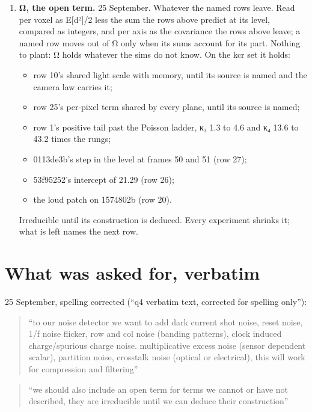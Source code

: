 \begin{enumerate}
\item \textbf{Ω, the open term.} 25 September. Whatever the named rows leave. Read per voxel as E[d²]/2 less the sum the rows above predict at its level, compared as integers, and per axis as the covariance the rows above leave; a named row moves out of Ω only when its sums account for its part. Nothing to plant: Ω holds whatever the sims do not know. On the kcr set it holds:

\begin{itemize}
\item row 10's shared light scale with memory, until its source is named and the camera law carries it;
\item row 25's per-pixel term shared by every plane, until its source is named;
\item row 1's positive tail past the Poisson ladder, κ₃ 1.3 to 4.6 and κ₄ 13.6 to 43.2 times the rungs;
\item 0113de3b's step in the level at frames 50 and 51 (row 27);
\item 53f95252's intercept of 21.29 (row 26);
\item the loud patch on 1574802b (row 20).
\end{itemize}

Irreducible until its construction is deduced. Every experiment shrinks it; what is left names the next row.
\end{enumerate}

\section{\texorpdfstring{What was asked for, verbatim}{What was asked for, verbatim}}

25 September, spelling corrected (“q4 verbatim text, corrected for spelling only”):

\begin{quote}
“to our noise detector we want to add dark current shot noise, reset noise, 1/f noise flicker, row and col noise (banding patterns), clock induced charge/spurious charge noise. multiplicative excess noise (sensor dependent scalar), partition noise, crosstalk noise (optical or electrical), this will work for compression and filtering”

\end{quote}

\begin{quote}
“we should also include an open term for terms we cannot or have not described, they are irreducible until we can deduce their construction”

\end{quote}

